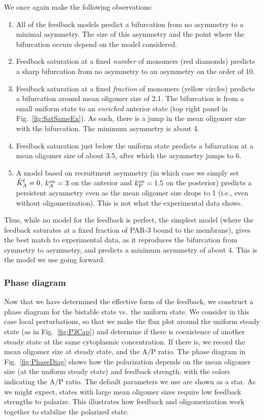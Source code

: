 \documentclass[11pt]{article}
\newcommand{\6}[1]{#1_{\text{6}}}
\newcommand{\3}[1]{#1_{\text{3}}}
\begin{document}
We once again make the following observations:
\begin{enumerate}
\item All of the feedback models predict a bifurcation from no asymmetry to a minimal asymmetry. The size of this asymmetry and the point where the bifurcation occurs depend on the model considered. 
\item Feedback saturation at a fixed \emph{number} of monomers (red diamonds) predicts a sharp bifurcation from no asymmetry to an asymmetry on the order of 10. 
\item Feedback saturation at a fixed \emph{fraction} of monomers (yellow circles) predicts a bifurcation  around mean oligomer size of 2.1. The bifurcation is from a small uniform state to an \emph{enriched} anterior state (top right panel in Fig.\ \ref{fig:SatSameEx}). As such, there is a jump in the mean oligomer size with the bifurcation. The minimum asymmetry is about 4. 
\item Feedback saturation just below the uniform state predicts a bifurcation at a mean oligomer size of about 3.5, after which the asymmetry jumps to 6. 
\item A model based on recruitment asymmetry (in which case we simply set $\hat{K}^\text{f}_A=0$, $k^\text{on}_A=3$ on the anterior and $k^\text{on}_P=1.5$ on the posterior) predicts a persistent asymmetry even as the mean oligomer size drops to 1 (i.e., even without oligomerization). This is not what the experimental data shows.
\end{enumerate}
Thus, while no model for the feedback is perfect, the simplest model (where the feedback saturates at a fixed fraction of PAR-3 bound to the membrane), gives the best match to experimental data, as it reproduces the bifurcation from symmetry to asymmetry, and predicts a minimum asymmetry of about 4. This is the model we use going forward.

\subsubsection{Phase diagram}
Now that we have determined the effective form of the feedback, we construct a phase diagram for the bistable state vs.\ the uniform state. We consider in this case local perturbations, so that we make the flux plot around the uniform steady state (as in Fig.\ \ref{fig:P3Cap}) and determine if there is coexistence of another steady state at the same cytoplasmic concentration. If there is, we record the mean oligomer size at steady state, and the A/P ratio. The phase diagram in Fig.\ \ref{fig:PhaseDiag} shows how the polarization depends on the mean oligomer size (at the uniform steady state) and feedback strength, with the colors indicating the A/P ratio. The default parameters we use are shown as a star. As we might expect, states with large mean oligomer sizes require low feedback strengths to polarize. This illustrates how feedback and oligomerization work together to stabilize the polarized state.
\end{document}
